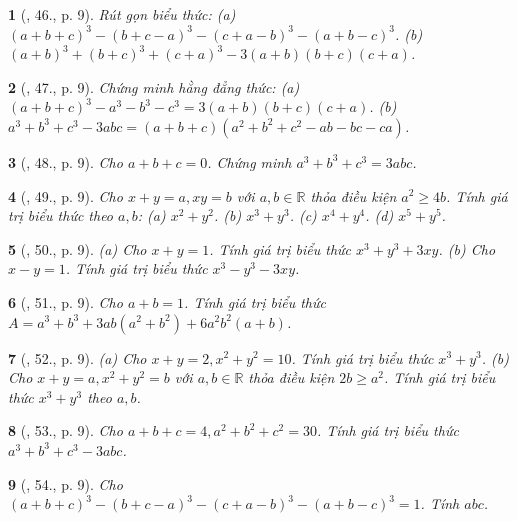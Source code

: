 \documentclass{article}
\newtheorem{baitoan}{}
\begin{document}
\begin{baitoan}[\cite{Binh_Toan_8_tap_1}, 46., p. 9]
	Rút gọn biểu thức: (a) $(a + b + c)^3 - (b + c - a)^3 - (c + a - b)^3 - (a + b - c)^3$. (b) $(a + b)^3 + (b + c)^3 + (c + a)^3 - 3(a + b)(b + c)(c + a)$.
\end{baitoan}

\begin{baitoan}[\cite{Binh_Toan_8_tap_1}, 47., p. 9]
	Chứng minh hằng đẳng thức: (a) $(a + b + c)^3 - a^3 - b^3 - c^3 = 3(a + b)(b + c)(c + a)$. (b) $a^3 + b^3 + c^3 - 3abc = (a + b + c)(a^2 + b^2 + c^2 - ab - bc - ca)$.
\end{baitoan}

\begin{baitoan}[\cite{Binh_Toan_8_tap_1}, 48., p. 9]
	Cho $a + b + c = 0$. Chứng minh $a^3 + b^3 + c^3 = 3abc$.
\end{baitoan}

\begin{baitoan}[\cite{Binh_Toan_8_tap_1}, 49., p. 9]
	Cho $x + y = a,xy = b$ với $a,b\in\mathbb{R}$ thỏa điều kiện $a^2\ge4b$. Tính giá trị biểu thức theo $a,b$: (a) $x^2 + y^2$. (b) $x^3 + y^3$. (c) $x^4 + y^4$. (d) $x^5 + y^5$.
\end{baitoan}

\begin{baitoan}[\cite{Binh_Toan_8_tap_1}, 50., p. 9]
	(a) Cho $x + y = 1$. Tính giá trị biểu thức $x^3 + y^3 + 3xy$. (b) Cho $x - y = 1$. Tính giá trị biểu thức $x^3 - y^3 - 3xy$. 
\end{baitoan}

\begin{baitoan}[\cite{Binh_Toan_8_tap_1}, 51., p. 9]
	Cho $a + b = 1$. Tính giá trị biểu thức $A = a^3 + b^3 + 3ab(a^2 + b^2) + 6a^2b^2(a + b)$.
\end{baitoan}

\begin{baitoan}[\cite{Binh_Toan_8_tap_1}, 52., p. 9]
	(a) Cho $x + y = 2,x^2 + y^2 = 10$. Tính giá trị biểu thức $x^3 + y^3$. (b) Cho $x + y = a,x^2 + y^2 = b$ với $a,b\in\mathbb{R}$ thỏa điều kiện $2b\ge a^2$. Tính giá trị biểu thức $x^3 + y^3$ theo $a,b$.
\end{baitoan}

\begin{baitoan}[\cite{Binh_Toan_8_tap_1}, 53., p. 9]
	Cho $a + b + c = 4,a^2 + b^2 + c^2 = 30$. Tính giá trị biểu thức $a^3 + b^3 + c^3 - 3abc$.
\end{baitoan}

\begin{baitoan}[\cite{Binh_Toan_8_tap_1}, 54., p. 9]
	Cho $(a + b + c)^3 - (b + c - a)^3 - (c + a - b)^3 - (a + b - c)^3 = 1$. Tính $abc$.
\end{baitoan}
\end{document}
